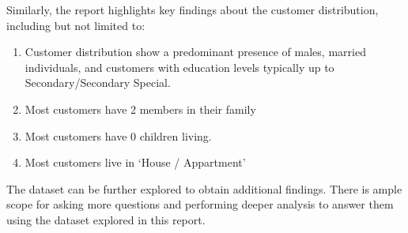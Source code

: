 \documentclass{article}\usepackage[]{graphicx}\usepackage[]{xcolor}
\begin{document}
Similarly, the report highlights key findings about the customer distribution, including but not limited to:\\

\begin{enumerate}
\item Customer distribution show a predominant presence of males, married individuals, and customers with education levels typically up to Secondary/Secondary Special.
\item Most customers have 2 members in their family
\item Most customers have 0 children living.  
\item Most customers live in `House / Appartment' \\
\end{enumerate}

The dataset can be further explored to obtain additional findings. There is ample scope for asking more questions and performing deeper analysis to answer them using the dataset explored in this report.

\newpage
{} %

\end{document}
